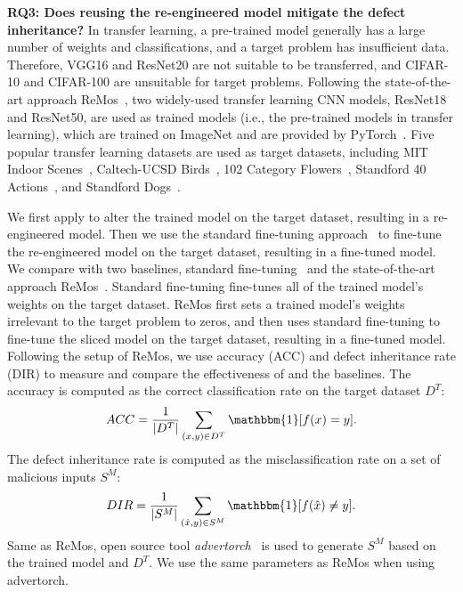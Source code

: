 \noindent \textbf{RQ3: Does reusing the re-engineered model mitigate the defect inheritance?} 
In transfer learning, a pre-trained model generally has a large number of weights and classifications, and a target problem has insufficient data. Therefore, VGG16 and ResNet20 are not suitable to be transferred, and CIFAR-10 and CIFAR-100 are unsuitable for target problems.
Following the state-of-the-art approach ReMos~\cite{ReMos}, two widely-used transfer learning CNN models, ResNet18 and ResNet50, are used as trained models (i.e., the pre-trained models in transfer learning), which are trained on ImageNet and are provided by PyTorch~\cite{pytorchmodel}.
Five popular transfer learning datasets are used as target datasets, including MIT Indoor Scenes~\cite{tfdata_scenes}, Caltech-UCSD Birds~\cite{tfdata_birds}, 102 Category Flowers~\cite{tfdata_flowers}, Standford 40 Actions~\cite{tfdata_actions}, and Standford Dogs~\cite{tfdata_dogs}.

We first apply \projectName to alter the trained model on the target dataset, resulting in a re-engineered model.
Then we use the standard fine-tuning approach~\cite{transfer1, transfer2} to fine-tune the re-engineered model on the target dataset, resulting in a fine-tuned model.
We compare \projectName with two baselines, standard fine-tuning~\cite{transfer1, transfer2} and the state-of-the-art approach ReMos~\cite{ReMos}. %
Standard fine-tuning fine-tunes all of the trained model's weights on the target dataset.
ReMos first sets a trained model's weights irrelevant to the target problem to zeros, and then uses standard fine-tuning to fine-tune the sliced model on the target dataset, resulting in a fine-tuned model.
Following the setup of ReMos, we use accuracy (ACC) and defect inheritance rate (DIR) to measure and compare the effectiveness of \projectName and the baselines.
The accuracy is computed as the correct classification rate on the target dataset $D^T$:
\begin{gather}
    ACC= \frac{1}{|D^T|} \sum_{(x,y)\in D^T} \mathbbm{1}[f(x)=y].
\end{gather}
The defect inheritance rate is computed as the misclassification rate on a set of malicious inputs $S^M$:
\begin{gather}
    DIR=\frac{1}{|S^M|} \sum_{(\hat{x},y)\in S^M} \mathbbm{1}[f(\hat{x})\ne y].
\end{gather}
Same as ReMos\cite{ReMos}, open source tool \textit{advertorch}~\cite{advertorch} is used to generate $S^M$
based on the trained model and $D^T$.
We use the same parameters as ReMos when using advertorch.

